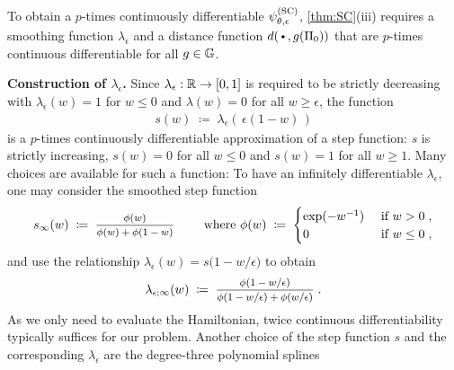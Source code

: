To obtain a $p$-times continuously differentiable $\psi^{(\rm SC)}_{\theta,\epsilon}$, \cref{thm:SC}(iii) requires a smoothing function $\lambda_\epsilon$ and a distance function $d(\argdot, g(\Pi_0))$ that are $p$-times continuous differentiable for all $g \in \mathbb{G}$.

\vspace{.5em}

\noindent
\textbf{Construction of $\lambda_\epsilon$.} Since $\lambda_\epsilon: \mathbb{R} \rightarrow [0,1]$ is required to be strictly decreasing with $\lambda_\epsilon(w) = 1$ for $w \leq 0$ and $\lambda(w)=0$ for all $w \geq \epsilon$, the function 
\begin{align*}
    s(w) \;\coloneqq\; \lambda_\epsilon( \, \epsilon( 1 - w) \, )
\end{align*}
is a $p$-times continuously differentiable approximation of a step function: $s$ is strictly increasing, $s(w) = 0$ for all $w \leq 0$ and $s(w) = 1$ for all $w \geq 1$. Many choices are available for such a function: To have an infinitely differentiable $\lambda_\epsilon$, one may consider the smoothed step function
\begin{align*}
    s_\infty(w) \;\coloneqq\; \mfrac{ \phi(w) }{ \phi(w) + \phi(1-w)}
    \qquad 
    \text{ where }
    \phi(w ) \;\coloneqq\; \begin{cases}
        \exp(- w^{-1}) & \text{ if } w > 0 \;,
        \\
        0 & \text{ if } w \leq 0 \;,
    \end{cases}
\end{align*}
and use the relationship $\lambda_\epsilon(w) = s\big(  1 - w / \epsilon \big)$ to obtain
\begin{align*}
    \lambda_{\epsilon;\infty}(w) 
    \;\coloneqq\;
    \mfrac{ \phi(1 - w / \epsilon) }{ \phi( 1 - w/\epsilon) + \phi(w / \epsilon)}
     \;.
\end{align*}
As we only need to evaluate the Hamiltonian, twice continuous differentiability typically suffices for our problem. Another choice of the step function $s$ and the corresponding $\lambda_\epsilon$ are the degree-three polynomial splines
